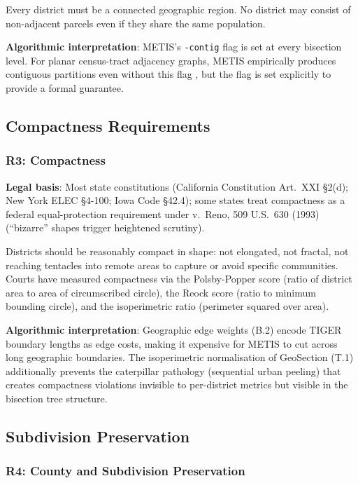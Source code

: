 Every district must be a connected geographic region.
No district may consist of non-adjacent parcels even if they share the same
population.

\textbf{Algorithmic interpretation}: METIS's \texttt{-contig} flag is set at
every bisection level.
For planar census-tract adjacency graphs, METIS empirically produces contiguous
partitions even without this flag \citep{b8paper}, but the flag is set explicitly
to provide a formal guarantee.

\subsection{Compactness Requirements}

\subsubsection*{R3: Compactness}

\textbf{Legal basis}: Most state constitutions (California Constitution Art.\ XXI
\S2(d); New York ELEC \S4-100; Iowa Code \S42.4); some states treat compactness
as a federal equal-protection requirement under \shaw{} v.\ Reno, 509 U.S.\ 630
(1993) (``bizarre'' shapes trigger heightened scrutiny).

Districts should be reasonably compact in shape: not elongated, not fractal,
not reaching tentacles into remote areas to capture or avoid specific communities.
Courts have measured compactness via the Polsby-Popper score (ratio of district
area to area of circumscribed circle), the Reock score (ratio to minimum
bounding circle), and the isoperimetric ratio (perimeter squared over area).

\textbf{Algorithmic interpretation}: Geographic edge weights (B.2) encode TIGER
boundary lengths as edge costs, making it expensive for METIS to cut across long
geographic boundaries.
The isoperimetric normalisation of GeoSection (T.1) additionally prevents the
caterpillar pathology (sequential urban peeling) that creates compactness violations
invisible to per-district metrics but visible in the bisection tree structure.

\subsection{Subdivision Preservation}

\subsubsection*{R4: County and Subdivision Preservation}

